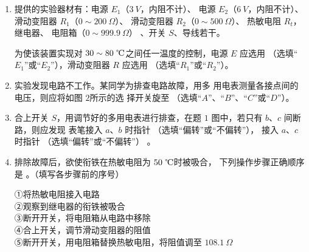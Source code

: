 \begin{enumerate}
\begin{enumerate}
\item
提供的实验器材有：电源 $ E_{1} $（$ 3 \ V $，内阻不计）、
电源 $ E_{2} $（$ 6 \ V $，内阻不计）、
滑动变阻器 $ R_{1} $（$ 0 \sim 200 \ \Omega $）、
滑动变阻器 $ R_{2} $（$ 0 \sim 500 \ \Omega $）、 热敏电阻 $ R_t $，继电器、
电阻箱（$ 0 \sim 999.9 \ \Omega $）
、开关 $ S $、导线若干。
\begin{figure}[h!]
\centering
\begin{subfigure}{0.4\linewidth}
\centering
 
\caption{}\label{}
\end{subfigure}
\begin{subfigure}{0.4\linewidth}
\centering
 
\caption{}\label{}
\end{subfigure}
\end{figure}


为使该装置实现对 $ 30 \sim 80 \ \celsius $之间任一温度的控制，电源 $ E $
应选用
\underlinegap 
（选填“$ E_{1} $”或“$ E_{2} $”），滑动变阻器 $ R $ 应选用
\underlinegap 
（选填“$ R_{1} $”或“$ R_{2} $”）。


\item 
实验发现电路不工作。某同学为排查电路故障，用多
用电表测量各接点间的电压，则应将如图 $ 2 $所示的选
择开关旋至
\underlinegap 
（选填“$ A $”、“$ B $”、“$ C $”或“$ D $”）。

\item 
合上开关 $ S $，用调节好的多用电表进行排查，在题 $ 1 $ 图中，若只有 $ b $、$ c $ 间断路，则应发现
表笔接入 $ a $、$ b $ 时指针 \underlinegap （选填“偏转”或“不偏转”），
接入 $ a $、$ c $ 时指针
\underlinegap 
（选填“偏转”或“不偏转”）
。

\item 
排除故障后，欲使衔铁在热敏电阻为 $ 50 \ \celsius $时被吸合，
下列操作步骤正确顺序是
\underlinegap 
。（填写各步骤前的序号）

①将热敏电阻接入电路\\
②观察到继电器的衔铁被吸合\\
③断开开关，将电阻箱从电路中移除\\
④合上开关，调节滑动变阻器的阻值\\
⑤断开开关，用电阻箱替换热敏电阻，将阻值调至 $ 108.1 \ \Omega $


\end{enumerate}
\end{enumerate}
